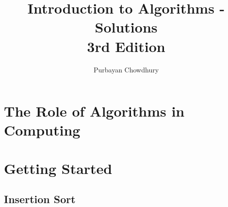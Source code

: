\documentclass[fontsize=12pt,paper=a4,open=any]{book}
\begin{document}
\title{Introduction to Algorithms - Solutions \\
\large 3rd Edition}
\author{Purbayan Chowdhury}

\maketitle

\tableofcontents

\chapter{The Role of Algorithms in Computing}

\chapter{Getting Started}
\section{Insertion Sort}
\end{document}
